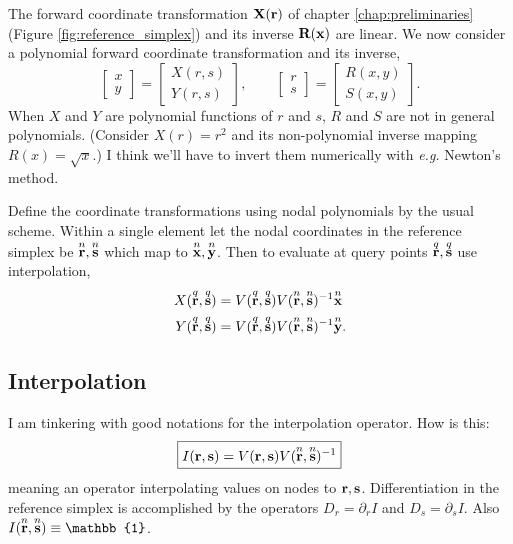 The forward coordinate transformation $\textbf{X}(\textbf{r})$ of chapter \ref{chap:preliminaries} (Figure \ref{fig:reference_simplex}) and its inverse $\textbf{R}(\textbf{x})$ are linear.  We now consider a polynomial forward coordinate transformation and its inverse,
%
\begin{equation}
\begin{bmatrix}
x \\ y
\end{bmatrix}
=
\begin{bmatrix}
X(r, s) \\ Y(r,s)
\end{bmatrix},
\qquad
\begin{bmatrix}
r \\ s
\end{bmatrix}
=
\begin{bmatrix}
R(x, y) \\ S(x,y)
\end{bmatrix}.
\end{equation}
%
When $X$ and $Y$ are polynomial functions of $r$ and $s$, $R$ and $S$ are not in general polynomials.  (Consider $X(r) = r^2$ and its non-polynomial inverse mapping $R(x) = \sqrt{x}$.)  I think we'll have to invert them numerically with \emph{e.g.} Newton's method.

Define the coordinate transformations using nodal polynomials by the usual scheme.  Within a single element let the nodal coordinates in the reference simplex be $\overset{n}{\textbf{r}}, \overset{n}{\textbf{s}}$ which map to $\overset{n}{\textbf{x}}, \overset{n}{\textbf{y}}$.  Then to evaluate at query points $\overset{q}{\textbf{r}}, \overset{q}{\textbf{s}}$ use interpolation,
%
\begin{equation}
\begin{aligned}
X(\overset{q}{\textbf{r}}, \overset{q}{\textbf{s}}) &= V(\overset{q}{\textbf{r}}, \overset{q}{\textbf{s}}) V(\overset{n}{\textbf{r}}, \overset{n}{\textbf{s}})^{-1} \overset{n}{\textbf{x}} \\
Y(\overset{q}{\textbf{r}}, \overset{q}{\textbf{s}}) &= V(\overset{q}{\textbf{r}}, \overset{q}{\textbf{s}}) V(\overset{n}{\textbf{r}}, \overset{n}{\textbf{s}})^{-1} \overset{n}{\textbf{y}}.
\end{aligned}
\end{equation}

\subsection{Interpolation}

I am tinkering with good notations for the interpolation operator.  How is this:
%
\begin{equation}
\boxed{
I(\ve r, \ve s) = V(\ve r, \ve s) V(\n{\ve r}, \n{\ve s})^{-1}
}%
\end{equation}
%
meaning an operator interpolating values on nodes to $\textbf{r}, \textbf{s}$.  Differentiation in the reference simplex is accomplished by the operators $D_r = \partial_r I$ and $D_s = \partial_s I$.  Also $I(\n{\ve r}, \n{\ve s}) \equiv \mathbb{1}$.

